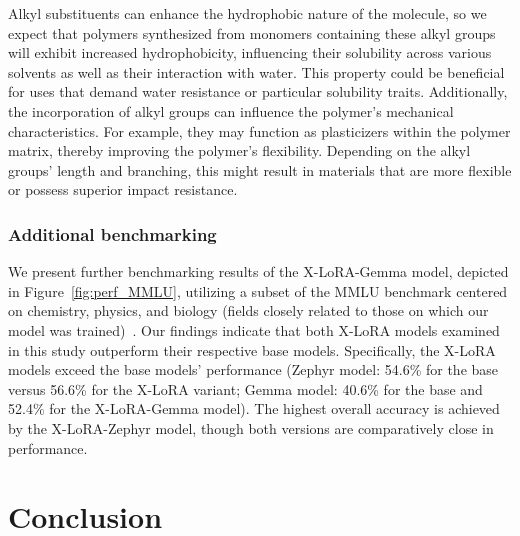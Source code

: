 Alkyl substituents can enhance the hydrophobic nature of the molecule, so we expect that polymers synthesized from monomers containing these alkyl groups will exhibit increased hydrophobicity, influencing their solubility across various solvents as well as their interaction with water. This property could be beneficial for uses that demand water resistance or particular solubility traits. Additionally, the incorporation of alkyl groups can influence the polymer's mechanical characteristics. For example, they may function as plasticizers within the polymer matrix, thereby improving the polymer's flexibility. Depending on the alkyl groups' length and branching, this might result in materials that are more flexible or possess superior impact resistance.

\subsubsection{Additional benchmarking} We present further benchmarking results of the X-LoRA-Gemma model, depicted in Figure~\ref{fig:perf_MMLU}, utilizing a subset of the MMLU benchmark centered on chemistry, physics, and biology (fields closely related to those on which our model was trained)~\cite{Hendrycks2020MeasuringUnderstanding}. Our findings indicate that both X-LoRA models examined in this study outperform their respective base models. Specifically, the X-LoRA models exceed the base models’ performance (Zephyr model: 54.6\% for the base versus 56.6\% for the X-LoRA variant; Gemma model: 40.6\% for the base and 52.4\% for the X-LoRA-Gemma model). The highest overall accuracy is achieved by the X-LoRA-Zephyr model, though both versions are comparatively close in performance.

\section{Conclusion}

